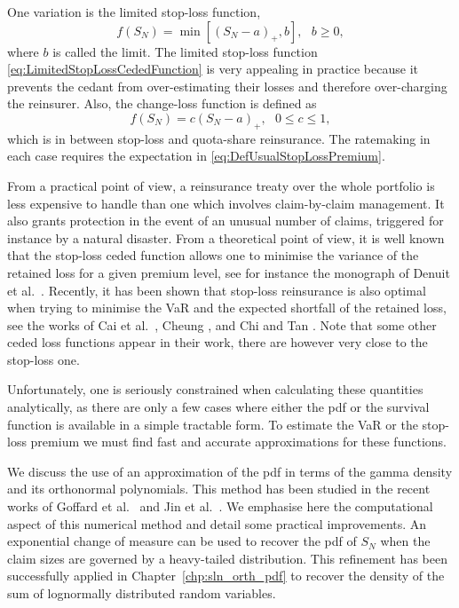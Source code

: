 One variation is the limited stop-loss function,
\begin{equation}\label{eq:LimitedStopLossCededFunction}
f(S_N)=\min[(S_N-a)_{+},b],\text{ }b\geq0,
\end{equation}
where $b$ is called the limit. The limited stop-loss function \eqref{eq:LimitedStopLossCededFunction} is very appealing in practice because it prevents the cedant from over-estimating their losses and therefore over-charging the reinsurer.
Also, the change-loss function is defined as
\begin{equation*}\label{eq:ChangeLossCededFunction}
f(S_N)=c(S_N-a)_{+},\text{ }0\leq c\leq1,
\end{equation*}
which is in between stop-loss and quota-share reinsurance. The ratemaking in each case requires the expectation in \eqref{eq:DefUsualStopLossPremium}.

From a practical point of view, a reinsurance treaty over the whole portfolio is less expensive to handle than one which involves claim-by-claim management. It also grants protection in the event of an unusual number of claims, triggered for instance by a natural disaster. From a theoretical point of view, it is well known that the stop-loss ceded function allows one to minimise the variance of the retained loss for a given premium level, see for instance the monograph of Denuit et al.\ \cite{DeDhGoKa06}. Recently, it has been shown that stop-loss reinsurance is also optimal when trying to minimise the VaR and the expected shortfall of the retained loss, see the works of Cai et al.\ \cite{CaTaWeZh08}, Cheung \cite{Ch10}, and Chi and Tan \cite{ChTa11}. Note that some other ceded loss functions appear in their work, there are however very close to the stop-loss one.

Unfortunately, one is seriously constrained when calculating these quantities analytically, as there are only a few cases where either the pdf or the survival function is available in a simple tractable form. To estimate the VaR or the stop-loss premium we must find fast and accurate approximations for these functions.

We discuss the use of an approximation of the pdf in terms of the gamma density and its orthonormal polynomials. This method has been studied in the recent works of Goffard et al.\ \cite{GoLoPo15} and Jin et al.\ \cite{JiPrRe16}. We emphasise here the computational aspect of this numerical method and detail some practical improvements. An exponential change of measure can be used to recover the pdf of $S_N$ when the claim sizes are governed by a heavy-tailed distribution. This refinement has been successfully applied in Chapter~\ref{chp:sln_orth_pdf} to recover the density of the sum of lognormally distributed random variables.

